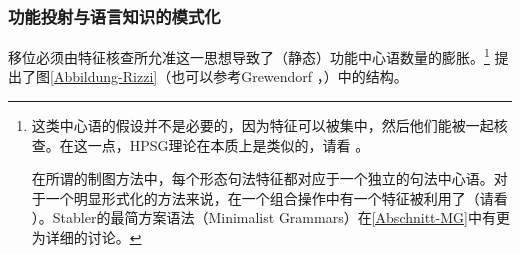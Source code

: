 \subsubsection{功能投射与语言知识的模式化}

移位必须由特征核查所允准这一思想导致了（静态）功能中心语数量的膨胀。\footnote{%
这类中心语的假设并不是必要的，因为特征可以被集中，然后他们能被一起核查。在这一点，HPSG\indexhpsgc 理论在本质上是类似的，请看 。

在所谓的制图方法中，每个形态句法特征都对应于一个独立的句法中心语\citep[, 61]{CR2010a}。对于一个明显形式化的方法来说，在一个组合操作中有一个特征被利用了（请看 ）。Stabler的最简方案语法（Minimalist Grammars）\indexmgc 在\ref{Abschnitt-MG}中有更为详细的讨论。
}
 \citet[]{Rizzi97a-u}提出了图\vref{Abbildung-Rizzi}（也可以参考Grewendorf \citeyear[, 240]{Grewendorf2002a}，\citeyear{Grewendorf2009a}）中的结构。



